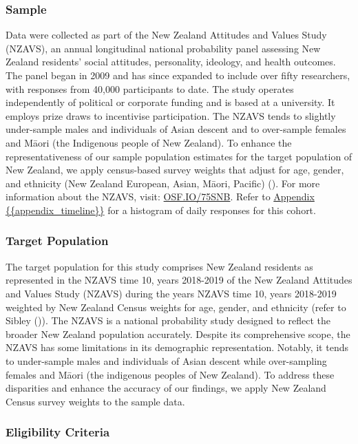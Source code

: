 \documentclass[
  single column]{article}
\begin{document}
\subsubsection{Sample}\label{sample}

Data were collected as part of the New Zealand Attitudes and Values
Study (NZAVS), an annual longitudinal national probability panel
assessing New Zealand residents' social attitudes, personality,
ideology, and health outcomes. The panel began in 2009 and has since
expanded to include over fifty researchers, with responses from 40,000
participants to date. The study operates independently of political or
corporate funding and is based at a university. It employs prize draws
to incentivise participation. The NZAVS tends to slightly under-sample
males and individuals of Asian descent and to over-sample females and
Māori (the Indigenous people of New Zealand). To enhance the
representativeness of our sample population estimates for the target
population of New Zealand, we apply census-based survey weights that
adjust for age, gender, and ethnicity (New Zealand European, Asian,
Māori, Pacific) (). For more
information about the NZAVS, visit:
\href{https://doi.org/10.17605/OSF.IO/75SNB}{OSF.IO/75SNB}. Refer to
\hyperref[appendix-timeline]{Appendix \{\{appendix\_timeline\}\}} for a
histogram of daily responses for this cohort.

\subsubsection{Target Population}\label{target-population}

The target population for this study comprises New Zealand residents as
represented in the NZAVS time 10, years 2018-2019 of the New Zealand
Attitudes and Values Study (NZAVS) during the years NZAVS time 10, years
2018-2019 weighted by New Zealand Census weights for age, gender, and
ethnicity (refer to Sibley ()). The NZAVS
is a national probability study designed to reflect the broader New
Zealand population accurately. Despite its comprehensive scope, the
NZAVS has some limitations in its demographic representation. Notably,
it tends to under-sample males and individuals of Asian descent while
over-sampling females and Māori (the indigenous peoples of New Zealand).
To address these disparities and enhance the accuracy of our findings,
we apply New Zealand Census survey weights to the sample data.

\subsubsection{Eligibility Criteria}\label{eligibility-criteria}
\end{document}
